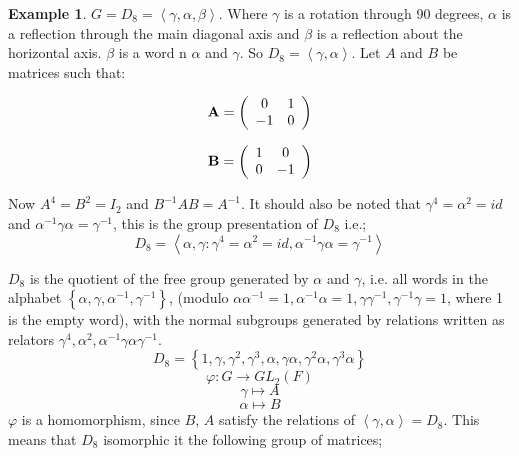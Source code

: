 \documentclass[12pt]{amsart}
\theoremstyle{definition}
\newtheorem{example}[theorem]{Example}
\begin{document}
\begin{example}
$G = D_{8} = \left\langle \gamma, \alpha, \beta \right\rangle$. Where $\gamma$ is a rotation through 90 degrees, $\alpha$ is a reflection through the main diagonal axis and $\beta$ is a reflection about the horizontal axis. $\beta$ is a word n $\alpha$ and $\gamma$. So $D_{8} = \left\langle \gamma, \alpha \right\rangle$. Let $A$ and $B$ be matrices such that:

\begin{equation*}
\mbox{\textbf{A}} = \left(
\begin{array}{cc}
     0 & 1 \\
    - 1 & 0 \\
\end{array}
\right)
\end{equation*}

\begin{equation*}
\mbox{\textbf{B}} = \left(
\begin{array}{cc}
     1 & 0 \\
     0 & - 1 \\
\end{array}
\right)
\end{equation*}

Now $A^{4} = B^{2} = I_{2}$ and $B^{- 1} A B = A^{- 1}$. It should also be noted that $\gamma^{4} = \alpha^{2} = id$ and $\alpha^{-1} \gamma \alpha = \gamma^{- 1}$, this is the group presentation of $D_{8}$ i.e.; $$ D_{8} = \left\langle \alpha, \gamma : \gamma^{4} = \alpha^{2} = id, \alpha^{-1} \gamma \alpha = \gamma^{-1} \right\rangle$$

$D_{8}$ is the quotient of the free group generated by $\alpha$ and $\gamma$, i.e. all words in the alphabet $\left\{ \alpha, \gamma, \alpha^{- 1}, \gamma^{- 1} \right\}$, (modulo $\alpha \alpha^{- 1} = 1, \alpha^{- 1} \alpha = 1, \gamma \gamma^{- 1}, \gamma^{- 1} \gamma = 1$, where 1 is the empty word), with the normal subgroups generated by relations written as relators $ \gamma^{4}, \alpha^{2}, \alpha^{- 1} \gamma \alpha \gamma^{- 1}$.
$$D_{8} = \left\{ 1, \gamma, \gamma^{2}, \gamma^{3}, \alpha, \gamma \alpha, \gamma^{2} \alpha, \gamma^{3} \alpha \right\}$$
$$\varphi : G \rightarrow GL_{2} (F)$$
$$\gamma \mapsto A$$
$$\alpha \mapsto B$$
$\varphi$ is a homomorphism, since $B$, $A$ satisfy the relations of $\left\langle \gamma, \alpha \right\rangle = D_{8}$. This means that $D_{8}$ isomorphic it the following group of matrices;


\end{example}
\end{document}
